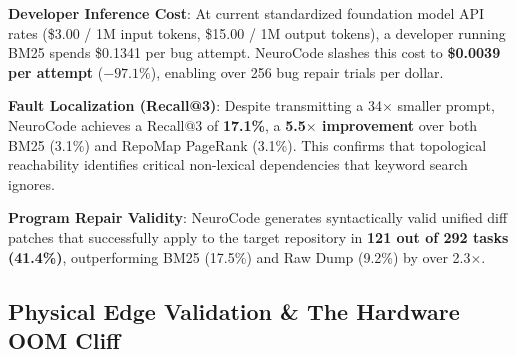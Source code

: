 \documentclass[journal]{IEEEtran}
\begin{document}
\textbf{Developer Inference Cost}: At current standardized foundation model API rates (\$3.00 / 1M input tokens, \$15.00 / 1M output tokens), a developer running BM25 spends \$0.1341 per bug attempt. NeuroCode slashes this cost to \textbf{\$0.0039 per attempt} ($-97.1\%$), enabling over 256 bug repair trials per dollar.

\textbf{Fault Localization (Recall@3)}: Despite transmitting a 34$\times$ smaller prompt, NeuroCode achieves a Recall@3 of \textbf{17.1\%}, a \textbf{5.5$\times$ improvement} over both BM25 (3.1\%) and RepoMap PageRank (3.1\%). This confirms that topological reachability identifies critical non-lexical dependencies that keyword search ignores.

\textbf{Program Repair Validity}: NeuroCode generates syntactically valid unified diff patches that successfully apply to the target repository in \textbf{121 out of 292 tasks (41.4\%)}, outperforming BM25 (17.5\%) and Raw Dump (9.2\%) by over 2.3$\times$.

\subsection{Physical Edge Validation \& The Hardware OOM Cliff}
\end{document}
